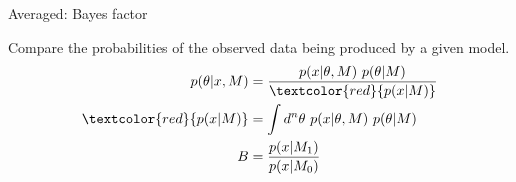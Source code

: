 \documentclass[
aspectratio=169,
14pt,
professionalfonts
]{beamer}
\begin{document}
\begin{frame}{Averaged: Bayes factor}
    \vspace{-0.5cm}
        \begin{minipage}{0.74\textwidth}
            Compare the probabilities of the observed data being produced by a given model.
            \begin{align*}
                p(\theta | x, M) &= \frac{p(x | \theta, M) ~ p(\theta | M)}{\textcolor{red}{p(x | M)}}\\
                \textcolor{red}{p(x | M)} &= \int d^n \theta ~ p(x | \theta, M) ~ p(\theta | M)\\
                B &= \frac{p(x | M_1)}{p(x| M_0)}
            \end{align*}
        \end{minipage}
        \begin{minipage}{0.25\textwidth}
            \begin{figure}
                \centering

\end{figure}
\end{minipage}
\end{frame}
\end{document}
